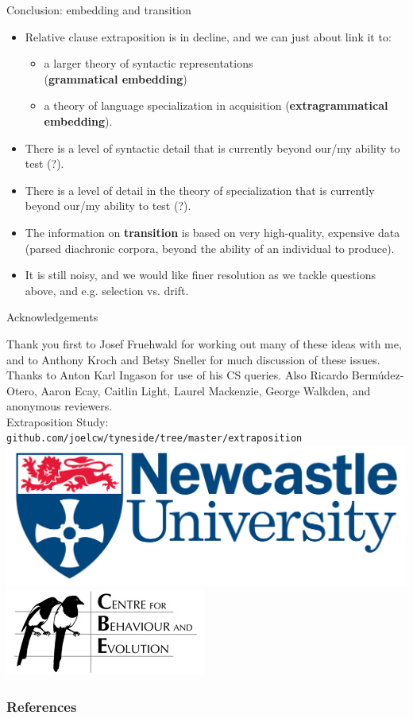 \documentclass[hyperref={pdfpagelabels=false}]{beamer}
\begin{document}
\begin{frame}{Conclusion: embedding and transition}
		\begin{itemize}
			\item Relative clause extraposition is in decline, and we can just about link it to:
			\begin{itemize}
			\item a larger theory of syntactic representations \\(\textbf{grammatical embedding})
			\item a theory of language specialization in acquisition (\textbf{extragrammatical embedding}).
			\end{itemize}
			\item There is a level of syntactic detail that is currently beyond our/my ability to test (?).
			\item There is a level of detail in the theory of specialization that is currently beyond our/my ability to test (?).
			\item The information on \textbf{transition} is based on very high-quality, expensive data (parsed diachronic corpora, beyond the ability of an individual to produce).%
			\item It is still noisy, and we would like finer resolution as we tackle questions above, and e.g. selection vs. drift.
		\end{itemize}
\end{frame}


\begin{frame}{Acknowledgements}
\begin{center}
Thank you first to Josef Fruehwald for working out many of these ideas with me, and to Anthony Kroch and Betsy Sneller for much discussion of these issues. Thanks to Anton Karl Ingason for use of his CS queries. Also Ricardo Bermúdez-Otero, Aaron Ecay, Caitlin Light, Laurel Mackenzie, George Walkden, and anonymous reviewers.
\vspace{5mm}\\
Extraposition Study: \texttt{github.com/joelcw/tyneside/tree/master/extraposition}\\\vspace{3mm}
\includegraphics[scale = 0.1]{ncllogo.jpg} \includegraphics[scale = 0.4]{cbelogo.jpg} 
\end{center}
\end{frame}


\begin{frame}[allowframebreaks]
\frametitle{References}
\newcommand*{\newblock}{natbib}


\end{frame}
\end{document}
